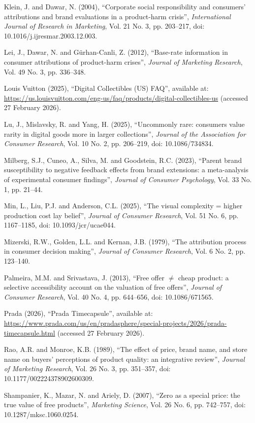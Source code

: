 \documentclass[12pt, a4paper]{article}
\newenvironment{referenceshang}{%
  \par\begingroup
  \setlength{\parindent}{0pt}%
  \setlength{\parskip}{0.5\baselineskip}%
  \everypar{\hangindent=1.5em\hangafter=1\relax}%
  \ignorespaces
}{%
  \par\endgroup
}
\begin{document}
\begin{referenceshang}
Klein, J. and Dawar, N. (2004), ``Corporate social responsibility and consumers' attributions and brand evaluations in a product-harm crisis'', \emph{International Journal of Research in Marketing}, Vol. 21 No. 3, pp. 203--217, doi: 10.1016/j.ijresmar.2003.12.003.

Lei, J., Dawar, N. and G\"urhan-Canli, Z. (2012), ``Base-rate information in consumer attributions of product-harm crises'', \emph{Journal of Marketing Research}, Vol. 49 No. 3, pp. 336--348.

Louis Vuitton (2025), ``Digital Collectibles (US) FAQ'', available at: \url{https://us.louisvuitton.com/eng-us/faq/products/digital-collectibles-us} (accessed 27 February 2026).

Lu, J., Mislavsky, R. and Yang, H. (2025), ``Uncommonly rare: consumers value rarity in digital goods more in larger collections'', \emph{Journal of the Association for Consumer Research}, Vol. 10 No. 2, pp. 206--219, doi: 10.1086/734834.

Milberg, S.J., Cuneo, A., Silva, M. and Goodstein, R.C. (2023), ``Parent brand susceptibility to negative feedback effects from brand extensions: a meta-analysis of experimental consumer findings'', \emph{Journal of Consumer Psychology}, Vol. 33 No. 1, pp. 21--44.

Min, L., Liu, P.J. and Anderson, C.L. (2025), ``The visual complexity = higher production cost lay belief'', \emph{Journal of Consumer Research}, Vol. 51 No. 6, pp. 1167--1185, doi: 10.1093/jcr/ucae044.

Mizerski, R.W., Golden, L.L. and Kernan, J.B. (1979), ``The attribution process in consumer decision making'', \emph{Journal of Consumer Research}, Vol. 6 No. 2, pp. 123--140.

Palmeira, M.M. and Srivastava, J. (2013), ``Free offer $\neq$ cheap product: a selective accessibility account on the valuation of free offers'', \emph{Journal of Consumer Research}, Vol. 40 No. 4, pp. 644--656, doi: 10.1086/671565.

Prada (2026), ``Prada Timecapsule'', available at: \url{https://www.prada.com/us/en/pradasphere/special-projects/2026/prada-timecapsule.html} (accessed 27 February 2026).

Rao, A.R. and Monroe, K.B. (1989), ``The effect of price, brand name, and store name on buyers' perceptions of product quality: an integrative review'', \emph{Journal of Marketing Research}, Vol. 26 No. 3, pp. 351--357, doi: 10.1177/002224378902600309.

Shampanier, K., Mazar, N. and Ariely, D. (2007), ``Zero as a special price: the true value of free products'', \emph{Marketing Science}, Vol. 26 No. 6, pp. 742--757, doi: 10.1287/mksc.1060.0254.


\end{referenceshang}
\end{document}
